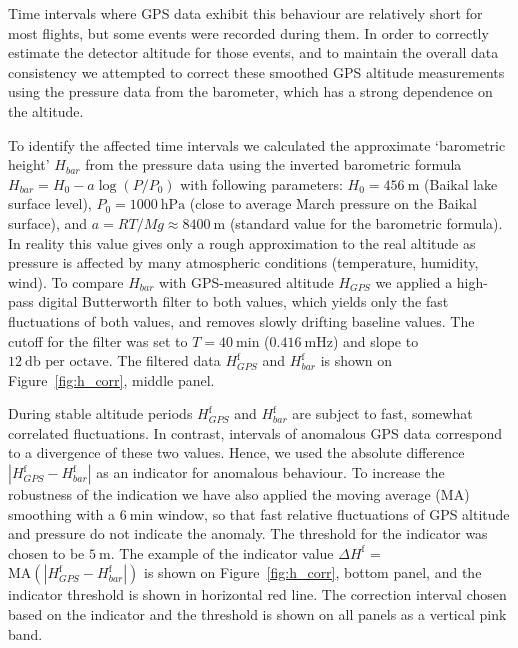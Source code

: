 \documentclass[universe,article,submit,moreauthors,pdftex]{Definitions/mdpi}
\begin{document}
\begin{paracol}{2}
Time intervals where GPS data exhibit this behaviour are relatively short for most flights, but some events were recorded during them. In order to correctly estimate the detector altitude for those events, and to maintain the overall data consistency we attempted to correct these smoothed GPS altitude measurements using the pressure data from the barometer, which has a strong dependence on the altitude.

To identify the affected time intervals we calculated the approximate `barometric height' $H_{bar}$ from the pressure data using the inverted barometric formula $H_{bar} = H_0 - a \log (P/P_0)$ with following parameters: $H_0 = 456~\textrm{m}$ (Baikal lake surface level), $P_0 = 1000~\textrm{hPa}$ (close to average March pressure on the Baikal surface), and $a = {RT}/{Mg} \approx 8400~\textrm{m}$ (standard value for the barometric formula). In reality this value gives only a rough approximation to the real altitude as pressure is affected by many atmospheric conditions (temperature, humidity, wind). To compare $H_{bar}$ with GPS-measured altitude $H_{GPS}$ we applied a high-pass digital Butterworth filter to both values, which yields only the fast fluctuations of both values, and removes slowly drifting baseline values. The cutoff for the filter was set to $T=40~\textrm{min}$ ($0.416~\textrm{mHz}$) and slope to $12~\textrm{db per octave}$. The filtered data $H_{GPS}^{\textrm{f}}$ and $H_{bar}^{\textrm{f}}$ is shown on Figure~\ref{fig:h_corr}, middle panel.

During stable altitude periods $H_{GPS}^{\textrm{f}}$ and $H_{bar}^{\textrm{f}}$ are subject to fast, somewhat correlated fluctuations. In contrast, intervals of anomalous GPS data correspond to a divergence of these two values. Hence, we used the absolute difference $|H_{GPS}^{\textrm{f}} - H_{bar}^{\textrm{f}}|$ as an indicator for anomalous behaviour. To increase the robustness of the indication we have also applied the moving average (MA) smoothing with a $6~\textrm{min}$ window, so that fast relative fluctuations of GPS altitude and pressure do not indicate the anomaly. The threshold for the indicator was chosen to be $5~\textrm{m}$. The example of the indicator value $\Delta H^\textrm{f}$ = $\textrm{MA}(|H_{GPS}^{\textrm{f}} - H_{bar}^{\textrm{f}}|)$ is shown on Figure~\ref{fig:h_corr}, bottom panel, and the indicator threshold is shown in horizontal red line. The correction interval chosen based on the indicator and the threshold is shown on all panels as a vertical pink band.


\end{paracol}
\end{document}
